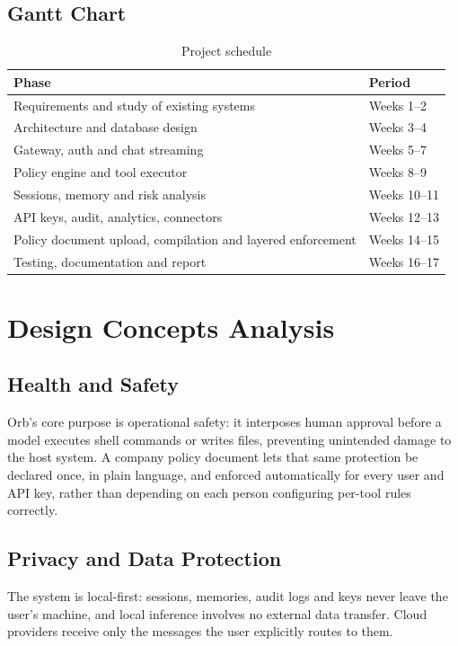 \documentclass[12pt,a4paper,oneside]{report}
\begin{document}
\section{Gantt Chart}
\begin{table}[h]
\caption{Project schedule}
\centering
\begin{tabular}{p{6cm}p{6cm}}
\toprule
\textbf{Phase} & \textbf{Period} \\
\midrule
Requirements and study of existing systems & Weeks 1--2 \\
Architecture and database design & Weeks 3--4 \\
Gateway, auth and chat streaming & Weeks 5--7 \\
Policy engine and tool executor & Weeks 8--9 \\
Sessions, memory and risk analysis & Weeks 10--11 \\
API keys, audit, analytics, connectors & Weeks 12--13 \\
Policy document upload, compilation and layered enforcement & Weeks
14--15 \\
Testing, documentation and report & Weeks 16--17 \\
\bottomrule
\end{tabular}
\end{table}

\chapter{Design Concepts Analysis}

\section{Health and Safety}
Orb's core purpose is operational safety: it interposes human
approval before a model executes shell commands or writes files,
preventing unintended damage to the host system. A company policy
document lets that same protection be declared once, in plain
language, and enforced automatically for every user and API key,
rather than depending on each person configuring per-tool rules
correctly.

\section{Privacy and Data Protection}
The system is local-first: sessions, memories, audit logs and keys
never leave the user's machine, and local inference involves no
external data transfer. Cloud providers receive only the messages the
user explicitly routes to them.
\end{document}
